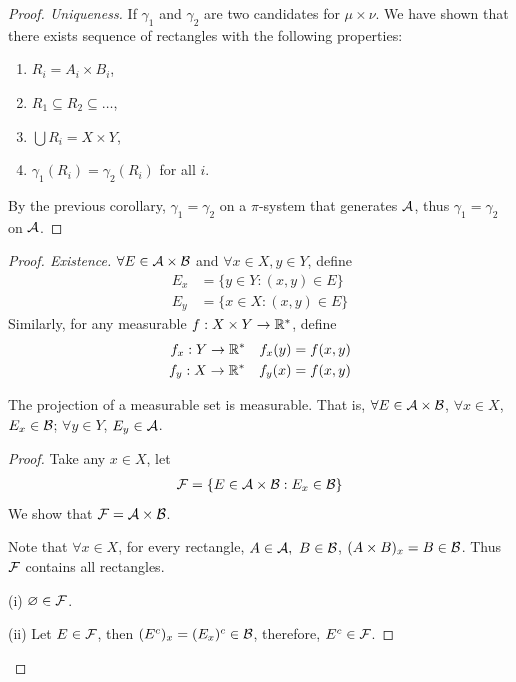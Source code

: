 \documentclass[11pt]{article}
\begin{document}
\begin{theorem}
\begin{proof}[Proof. Uniqueness]
			If $\gamma_1$ and $\gamma_2$ are two candidates for $\mu \times \nu$. 
			We have shown that there exists sequence of rectangles with the following properties:
			\begin{enumerate}
				\item $R_i = A_i \times B_i$,
				\item $R_1 \subseteq R_2 \subseteq \dots $,
				\item $\bigcup R_i = X \times Y$,
				\item $\gamma_1(R_i) = \gamma_2(R_i)$ for all $i$.
			\end{enumerate} 
			By the previous corollary, $\gamma_1 = \gamma_2$ on a $\pi$-system that generates $\mathcal{{A}}$, thus $\gamma_1 = \gamma_2$ on $\mathcal{{A}}$.
		\end{proof}
		\begin{proof}[Proof. Existence]
			$\forall E \in \mathcal{{A}} \times \mathcal{{B}}$ and $\forall x \in X, y \in Y$, define 
			\begin{align}
				E_x &= \{y \in Y : (x, y) \in E\} \\
				E_y &= \{x \in X : (x, y) \in E\}
			\end{align}
			Similarly, for any measurable $f: X \times Y \to \mathbb{R}^*$, define
			\begin{align}
				f_x: Y \to \mathbb{R}^*\quad f_x(y) = f(x, y) \\
				f_y: X \to \mathbb{R}^*\quad f_y(x) = f(x, y)
			\end{align}
			\begin{tcolorbox}
			\begin{lemma}
				The projection of a measurable set is measurable. That is,
				$\forall E \in \mathcal{{A}} \times \mathcal{{B}}$, $\forall x \in X$, $E_x \in \mathcal{{B}}$; $\forall y \in Y$, $E_y \in \mathcal{{A}}$.
			\end{lemma}
			\begin{proof}
				Take any $x \in X$, let
				\begin{align}
					\mathcal{{F}} = \{E \in \mathcal{{A}} \times \mathcal{{B}} : E_x \in \mathcal{{B}} \}
				\end{align}
				We show that $\mathcal{{F}} = \mathcal{{A}} \times \mathcal{{B}}$.
				
				Note that $\forall x \in X$, for every rectangle, $A \in \mathcal{{A}},\ B \in \mathcal{{B}}$, $(A \times B)_x = B \in \mathcal{{B}}$. Thus $\mathcal{{F}}$ contains all rectangles.
				
				(i) $\varnothing \in \mathcal{{F}}$.
				
				(ii) Let $E \in \mathcal{{F}}$, then $(E^c)_x = (E_x)^c \in \mathcal{{B}}$, therefore, $E^c \in \mathcal{{F}}$.
				

\end{proof}
\end{tcolorbox}
\end{proof}
\end{theorem}
\end{document}
